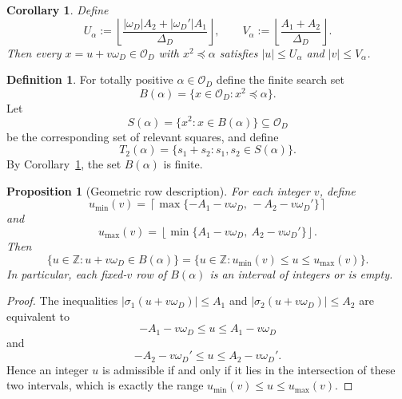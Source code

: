 \documentclass[manuscript,screen]{acmart}
\renewcommand{\le}{\leqslant}
\theoremstyle{plain}
\newtheorem{proposition}[theorem]{Proposition}
\newtheorem{corollary}[theorem]{Corollary}
\theoremstyle{definition}
\newtheorem{definition}[theorem]{Definition}
\theoremstyle{nonitalicremark}
\newcommand{\Z}{\mathbb{Z}}
\newcommand{\OD}{\mathcal{O}_D}
\newcommand{\wD}{\omega_D}
\newcommand{\wDp}{\omega_D'}
\newcommand{\sig}{\sigma}
\begin{document}
\begin{corollary}\label{cor:box}
Define
\[
U_\alpha := \left\lfloor \frac{|\wD|A_2+|\wDp|A_1}{\Delta_D} \right\rfloor,
\qquad
V_\alpha := \left\lfloor \frac{A_1+A_2}{\Delta_D} \right\rfloor.
\]
Then every $x=u+v\wD \in \OD$ with $x^2\preccurlyeq \alpha$ satisfies
$|u|\le U_\alpha$ and $|v|\le V_\alpha$.
\end{corollary}

\begin{definition}
For totally positive $\alpha \in \OD$ define the finite search set
\[
B(\alpha)=\{x\in \OD : x^2\preccurlyeq \alpha\}.
\]
Let
\[
S(\alpha)=\{x^2 : x \in B(\alpha)\} \subseteq \OD
\]
be the corresponding set of relevant squares, and define
\[
T_2(\alpha)=\{s_1+s_2 : s_1,s_2 \in S(\alpha)\}.
\]
By Corollary~\ref{cor:box}, the set $B(\alpha)$ is finite.
\end{definition}

\begin{proposition}[Geometric row description]\label{prop:rows}
For each integer $v$, define
\[
u_{\min}(v)=\left\lceil \max\{-A_1-v\wD,\,-A_2-v\wDp\}\right\rceil
\]
and
\[
u_{\max}(v)=\left\lfloor \min\{A_1-v\wD,\ A_2-v\wDp\}\right\rfloor.
\]
Then
\[
\{u\in\Z : u+v\wD\in B(\alpha)\}=\{u\in\Z : u_{\min}(v)\le u\le u_{\max}(v)\}.
\]
In particular, each fixed-$v$ row of $B(\alpha)$ is an interval of integers or is empty.
\end{proposition}

\begin{proof}
The inequalities $|\sig_1(u+v\wD)|\le A_1$ and $|\sig_2(u+v\wD)|\le A_2$ are equivalent to
\[
-A_1-v\wD \le u \le A_1-v\wD
\]
and
\[
-A_2-v\wDp \le u \le A_2-v\wDp.
\]
Hence an integer $u$ is admissible if and only if it lies in the intersection of these two
intervals, which is exactly the range $u_{\min}(v)\le u\le u_{\max}(v)$.
\end{proof}
\end{document}
